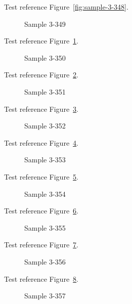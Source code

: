 Test reference Figure~\ref{fig:sample-3-348}.

\begin{figure}[tbhp]
\caption{Sample 3-349}
\label{fig:sample-3-349}
\end{figure}

Test reference Figure~\ref{fig:sample-3-349}.

\begin{figure}[tbhp]
\caption{Sample 3-350}
\label{fig:sample-3-350}
\end{figure}

Test reference Figure~\ref{fig:sample-3-350}.

\begin{figure}[tbhp]
\caption{Sample 3-351}
\label{fig:sample-3-351}
\end{figure}

Test reference Figure~\ref{fig:sample-3-351}.

\begin{figure}[tbhp]
\caption{Sample 3-352}
\label{fig:sample-3-352}
\end{figure}

Test reference Figure~\ref{fig:sample-3-352}.

\begin{figure}[tbhp]
\caption{Sample 3-353}
\label{fig:sample-3-353}
\end{figure}

Test reference Figure~\ref{fig:sample-3-353}.

\begin{figure}[tbhp]
\caption{Sample 3-354}
\label{fig:sample-3-354}
\end{figure}

Test reference Figure~\ref{fig:sample-3-354}.

\begin{figure}[tbhp]
\caption{Sample 3-355}
\label{fig:sample-3-355}
\end{figure}

Test reference Figure~\ref{fig:sample-3-355}.

\begin{figure}[tbhp]
\caption{Sample 3-356}
\label{fig:sample-3-356}
\end{figure}

Test reference Figure~\ref{fig:sample-3-356}.

\begin{figure}[tbhp]
\caption{Sample 3-357}
\label{fig:sample-3-357}
\end{figure}

